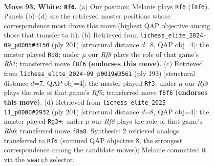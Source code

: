 \documentclass[11pt]{article}
\begin{document}
\clearpage

\begin{figure}[p]\centering
\begin{subfigure}{0.46\textwidth}\centering
\resizebox{\linewidth}{!}{%
\newchessgame
\chessboard[
  setfen={5R2/3k4/1P2b3/6R1/7r/5K2/8/8 w - - 5 93},
  showmover=false,
  pgfstyle=straightmove, color=movearrow, markmove={f8-f6}
]}
\caption{}
\end{subfigure}\hfill
\begin{subfigure}{0.46\textwidth}\centering
\resizebox{\linewidth}{!}{%
\newchessgame
\chessboard[
  setfen={1r3k2/7K/6B1/8/8/4R3/8/8 b - - 52 101},
  showmover=false,
  pgfstyle=straightmove, color=movearrow, markmove={b8-d8}
]}
\caption{}
\end{subfigure}
\\[4pt]
\begin{subfigure}{0.46\textwidth}\centering
\resizebox{\linewidth}{!}{%
\newchessgame
\chessboard[
  setfen={5k2/R7/4B3/3K4/5r2/8/8/8 b - - 74 97},
  showmover=false,
  pgfstyle=straightmove, color=movearrow, markmove={f4-f3}
]}
\caption{}
\end{subfigure}\hfill
\begin{subfigure}{0.46\textwidth}\centering
\resizebox{\linewidth}{!}{%
\newchessgame
\chessboard[
  setfen={8/6K1/5B2/7k/R7/7r/8/8 b - - 72 101},
  showmover=false,
  pgfstyle=straightmove, color=movearrow, markmove={h3-g3}
]}
\caption{}
\end{subfigure}
\caption{\textbf{Move 93, White: \texttt{Rf6}.} (a) Our position; Melanie plays \texttt{Rf6} (\texttt{f8f6}). Panels (b)--(d) are the retrieved master positions whose correspondence most drove this move (highest QAP objective among those that transfer to it). (b) Retrieved from \texttt{lichess\_elite\_2024-09\_p0005\#3150} (ply 201) [structural distance $d$=8, QAP obj=4]: the master played \texttt{Rd8}; under $\mu$ our \emph{Rf8} plays the role of that game's \emph{Rb1}; transferred move \texttt{f8f6} \textbf{(endorses this move)}. (c) Retrieved from \texttt{lichess\_elite\_2024-09\_p0019\#3561} (ply 193) [structural distance $d$=7, QAP obj=4]: the master played \texttt{Rf3}; under $\mu$ our \emph{Rf8} plays the role of that game's \emph{Rf5}; transferred move \texttt{f8f6} \textbf{(endorses this move)}. (d) Retrieved from \texttt{lichess\_elite\_2025-11\_p0000\#2932} (ply 201) [structural distance $d$=8, QAP obj=4]: the master played \texttt{Rg3+}; under $\mu$ our \emph{Rf8} plays the role of that game's \emph{Rh6}; transferred move \texttt{f8a8}. Synthesis: 2 retrieved analogs transferred to \texttt{Rf6} (summed QAP objective 8, the strongest correspondence among the candidate moves); Melanie committed it via the \texttt{search} selector.}
\label{fig:thought-m184}
\end{figure}
\end{document}
